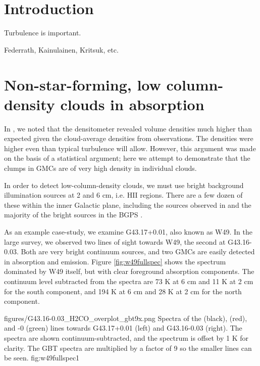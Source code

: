 
\section{Introduction}
Turbulence is important.

Federrath, Kainulainen, Kritsuk, etc.


\section{Non-star-forming, low column-density clouds in absorption}
In \citet{Ginsburg2011a}, we noted that the \formaldehyde densitometer revealed
volume densities much higher than expected given the cloud-average densities
from \thirteenco observations.  The densities were higher even than typical
turbulence will allow.  However, this argument was made on the basis of a
statistical argument; here we attempt to demonstrate that the clumps in GMCs
are of very high density in individual clouds.

In order to detect low-column-density clouds, we must use bright background
illumination sources at 2 and 6 cm, i.e. HII regions.  There are a few dozen of
these within the inner Galactic plane, including the sources observed in
\citet{Ginsburg2011a} and the majority of the bright sources in the BGPS
\citep{Ginsburg2013}.

As an example case-study, we examine G43.17+0.01, also known as W49.  In the
large survey, we observed two lines of sight towards W49, the second at
G43.16-0.03.  Both are very bright continuum sources, and two GMCs are easily
detected in \formaldehyde absorption and \thirteenco emission.  Figure
\ref{fig:w49fullspec} shows the spectrum dominated by W49 itself, but with
clear foreground absorption components.  The continuum level subtracted from the spectra
are 73 K at 6 cm and 11 K at 2 cm for the south component, and 194 K at 6 cm
and 28 K at 2 cm for the north component.


{figures/G43.16-0.03_H2CO_overplot_gbt9x.png}
{Spectra of the \formaldehyde \oneone (black), \twotwo (red), and -0 (green) lines towards G43.17+0.01 (left) and G43.16-0.03 (right).
The \formaldehyde spectra are shown continuum-subtracted, and the \thirteenco
spectrum is offset by 1 K for clarity.  The GBT \twotwo spectra are multiplied
by a factor of 9 so the smaller lines can be seen.
}{fig:w49fullspec}{1}

